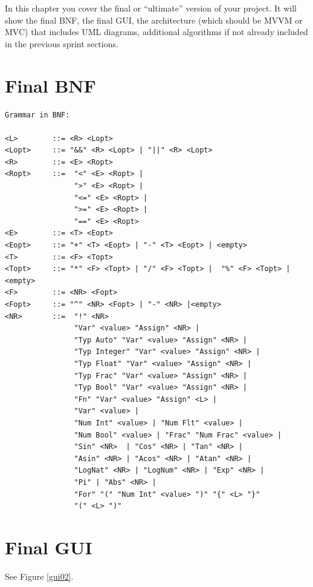 \documentclass[a4paper, oneside, 11pt]{report}
\begin{document}
	In this chapter you cover the final or ``ultimate'' version of your project. It will show the final BNF, the final GUI, the architecture (which should be MVVM or MVC) that includes UML diagrams, additional algorithms if not already included in the previous sprint sections.

	\section{Final BNF}
	\begin{verbatim}
Grammar in BNF:

<L>        ::= <R> <Lopt>
<Lopt>     ::= "&&" <R> <Lopt> | "||" <R> <Lopt>
<R>        ::= <E> <Ropt>
<Ropt>     ::=  "<" <E> <Ropt> |
                ">" <E> <Ropt> |
                "<=" <E> <Ropt> |
                ">=" <E> <Ropt> |
                "==" <E> <Ropt>
<E>        ::= <T> <Eopt>
<Eopt>     ::= "+" <T> <Eopt> | "-" <T> <Eopt> | <empty>
<T>        ::= <F> <Topt>
<Topt>     ::= "*" <F> <Topt> | "/" <F> <Topt> |  "%" <F> <Topt> |<empty>
<F>        ::= <NR> <Fopt>
<Fopt>     ::= "^" <NR> <Fopt> | "-" <NR> |<empty>
<NR>       ::=  "!" <NR>
                "Var" <value> "Assign" <NR> |
                "Typ Auto" "Var" <value> "Assign" <NR> |
                "Typ Integer" "Var" <value> "Assign" <NR> |
                "Typ Float" "Var" <value> "Assign" <NR> |
                "Typ Frac" "Var" <value> "Assign" <NR> |
                "Typ Bool" "Var" <value> "Assign" <NR> |
                "Fn" "Var" <value> "Assign" <L> |
                "Var" <value> |
                "Num Int" <value> | "Num Flt" <value> |
                "Num Bool" <value> | "Frac" "Num Frac" <value> |
                "Sin" <NR>  | "Cos" <NR> | "Tan" <NR> |
                "Asin" <NR> | "Acos" <NR> | "Atan" <NR> |
                "LogNat" <NR> | "LogNum" <NR> | "Exp" <NR> |
                "Pi" | "Abs" <NR> |
                "For" "(" "Num Int" <value> ")" "{" <L> "}"
                "(" <L> ")"
	\end{verbatim}
	\section{Final GUI}

	See Figure \ref{gui02}.
\end{document}
